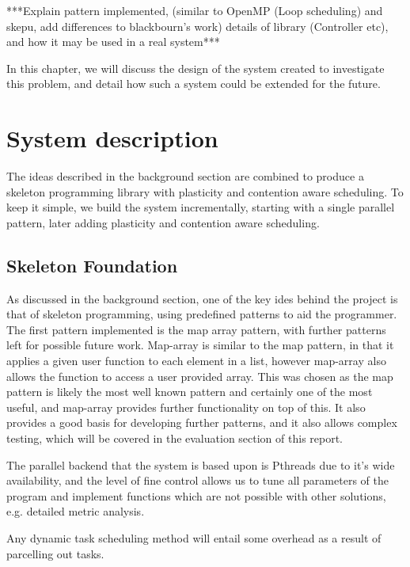 ***Explain pattern implemented, (similar to OpenMP (Loop scheduling) and skepu, add differences to blackbourn's work) details of library (Controller etc), and how it may be used in a real system***

In this chapter, we will discuss the design of the system created to investigate this problem, and detail how such a system could be extended for the future.



\section{System description}

The ideas described in the background section are combined to produce a skeleton programming library with plasticity and contention aware scheduling. To keep it simple, we build the system incrementally, starting with a single parallel pattern, later adding plasticity and contention aware scheduling. 



\subsection{Skeleton Foundation}

As discussed in the background section, one of the key ides behind the project is that of skeleton programming, using predefined patterns to aid the programmer. The first pattern implemented is the map array pattern, with further patterns left for possible future work. Map-array is similar to the map pattern, in that it applies a given user function to each element in a list, however map-array also allows the function to access a user provided array. This was chosen as the map pattern is likely the most well known pattern and certainly one of the most useful, and map-array provides further functionality on top of this. It also provides a good basis for developing further patterns, and it also allows complex testing, which will be covered in the evaluation section of this report.

The parallel backend that the system is based upon is Pthreads due to it's wide availability, and the level of fine control allows us to tune all parameters of the program and implement functions which are not possible with other solutions, e.g. detailed metric analysis. 

Any dynamic task scheduling method will entail some overhead as a result of parcelling out tasks. 

